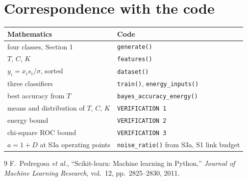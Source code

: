 \documentclass[11pt,a4paper]{article}
\begin{document}
\section{Correspondence with the code}
\begin{center}
\begin{tabular}{@{}ll@{}}
\toprule
Mathematics & Code \\
\midrule
four classes, Section 1 & \texttt{generate()} \\
$T$, $C$, $K$ & \texttt{features()} \\
$y_i = x_i s_i/\sigma$, sorted & \texttt{dataset()} \\
three classifiers & \texttt{train()}, \texttt{energy\_inputs()} \\
best accuracy from $T$ & \texttt{bayes\_accuracy\_energy()} \\
means and distribution of $T$, $C$, $K$ & \texttt{VERIFICATION 1} \\
energy bound & \texttt{VERIFICATION 2} \\
chi-square ROC bound & \texttt{VERIFICATION 3} \\
$a = 1 + D$ at S3a operating points & \texttt{noise\_ratio()} from S3a, S1 link budget \\
\bottomrule
\end{tabular}
\end{center}

\begin{thebibliography}{9}
 F.~Pedregosa \emph{et al.}, ``Scikit-learn: Machine learning
  in Python,'' \emph{Journal of Machine Learning Research}, vol.~12,
  pp.~2825--2830, 2011.
\end{thebibliography}
\end{document}
